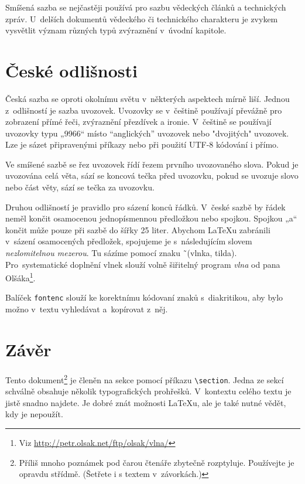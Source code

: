 \documentclass[twocolumn,10pt]{article}
\begin{document}
Smíšená sazba se nejčastěji používá pro sazbu vědeckých článků a technických zpráv. U~delších dokumentů vědeckého či technického charakteru je zvykem vysvětlit význam různých typů zvýraznění v~úvodní kapitole.

\section{České odlišnosti}

Česká sazba se oproti okolnímu světu v~některých aspektech mírně liší. Jednou z~odlišností je sazba uvozovek. Uvozovky se v~češtině používají převážně pro zobrazení přímé řeči, zvýraznění přezdívek a ironie. V~češtině se používají uvozovky typu „9966“ místo ``anglických'' uvozovek nebo "dvojitých" uvozovek. Lze je sázet připravenými příkazy nebo při použití UTF-8 kódování i přímo.

Ve smíšené sazbě se řez uvozovek řídí řezem prvního uvozovaného slova. Pokud je uvozována celá věta, sází se koncová tečka před uvozovku, pokud se uvozuje slovo nebo část věty, sází se tečka za uvozovku.

Druhou odlišností je pravidlo pro sázení konců řádků. V~české sazbě by řádek neměl končit osamocenou jednopísmennou předložkou nebo spojkou. Spojkou „a“ končit může pouze při sazbě do šířky 25 liter. Abychom \LaTeX u zabránili v~sázení osamocených předložek, spojujeme je s~následujícím slovem \emph{nezlomitelnou mezerou}. Tu sázíme pomocí znaku \~\ (vlnka, tilda). Pro~systematické doplnění vlnek slouží volně šiřitelný program \emph{vlna} od pana Olšáka\footnote{Viz \url{http://petr.olsak.net/ftp/olsak/vlna/}}.

Balíček \verb|fontenc| slouží ke korektnímu kódovaní znaků s~diakritikou, aby bylo možno v~textu vyhledávat a~kopírovat z~něj.

\section{Závěr}

Tento dokument\footnote{Příliš mnoho poznámek pod čarou čtenáře zbytečně rozptyluje. Používejte je opravdu střídmě. (Šetřete i s textem v~závorkách.)} je členěn na sekce pomocí příkazu \verb|\section|. Jedna ze sekcí schválně obsahuje několik typografických prohřešků. V~kontextu celého textu je jistě snadno najdete. Je dobré znát možnosti \LaTeX u, ale je také nutné vědět, kdy je nepoužít.
\end{document}
